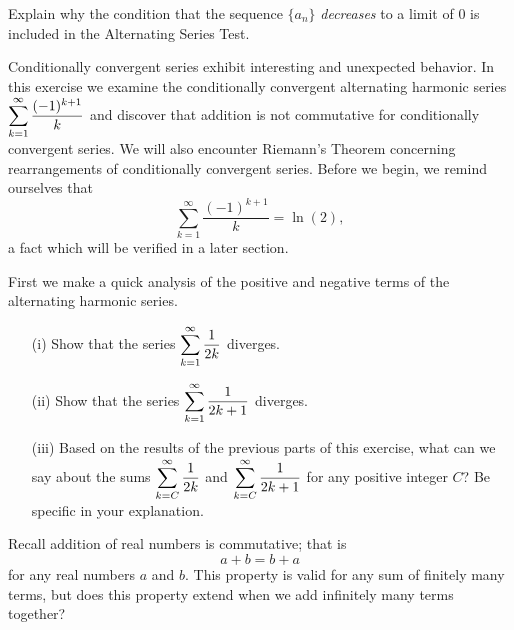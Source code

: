 \begin{exercises}
\begin{exerciseSolution}
\end{exerciseSolution}

    \item Explain why the condition that the sequence $\{a_n\}$ \emph{decreases} to a limit of 0 is included in the Alternating Series Test. 
    
        \ea

\item Conditionally convergent series exhibit interesting and unexpected behavior. In this exercise we examine the conditionally convergent alternating harmonic series $\displaystyle \sum_{k=1}^{\infty} \frac{(-1)^{k+1}}{k}$ and discover that addition is not commutative for conditionally convergent series. We will also encounter Riemann's Theorem concerning rearrangements of conditionally convergent series. Before we begin, we remind ourselves that
    \[\sum_{k=1}^{\infty} \frac{(-1)^{k+1}}{k} = \ln(2),\]
    a fact which will be verified in a later section.
\ba
\item First we make a quick analysis of the positive and negative terms of the alternating harmonic series.
    \begin{itemize}
    \item[(i)] Show that the series $\displaystyle \sum_{k=1}^{\infty} \frac{1}{2k}$ diverges.


    \item[(ii)] Show that the series $\displaystyle \sum_{k=1}^{\infty} \frac{1}{2k+1}$ diverges.


    \item[(iii)] Based on the results of the previous parts of this exercise, what can we say about the sums $\displaystyle \sum_{k=C}^{\infty} \frac{1}{2k}$ and $\displaystyle \sum_{k=C}^{\infty} \frac{1}{2k+1}$ for any positive integer $C$? Be specific in your explanation.

    \end{itemize}

\item Recall addition of real numbers is commutative; that is
\[a + b = b + a\]
for any real numbers $a$ and $b$. This property is valid for any sum of finitely many terms, but does this property extend when we add infinitely many terms together?


\end{exercises}
